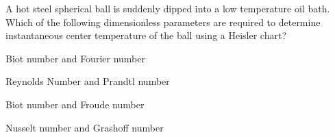     \item A hot steel spherical ball is suddenly dipped into a low temperature oil bath. Which of 
        the following dimensionless parameters are required to determine instantaneous center temperature
        of the ball using a Heisler chart?
        \hfill{}
            \begin{enumerate}
        \begin{multicols}{2}
                \item Biot number and Fourier number
                    \columnbreak
                \item Reynolds Number and Prandtl number
        \end{multicols}
        \begin{multicols}{2}
                \item Biot number and Froude number
                    \columnbreak
                \item Nusselt number and Grashoff number
        \end{multicols}
            \end{enumerate}
    
